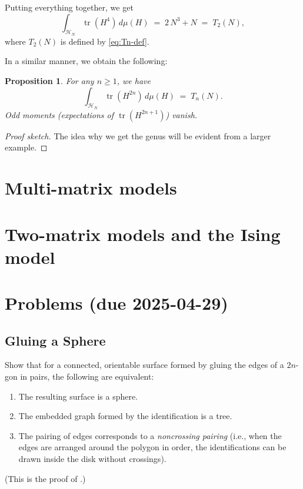 \documentclass[letterpaper,11pt,oneside,reqno]{article}
\numberwithin{equation}{section}
\newtheorem{proposition}{Proposition}[section]
\theoremstyle{definition}
\begin{document}
Putting everything together, we get
\[
  \int_{\mathcal{H}_N}\!\operatorname{tr}(H^4)\,d\mu(H)
  \;=\;
  2\,N^3 + N
  \;=\;
	T_2(N),
\]
where $T_2(N)$ is defined by \eqref{eq:Tn-def}.

In a similar manner, we obtain the following:
\begin{proposition}
	\label{prop:traces-moments}
	For any $n\ge 1$, we have
	\[
		\int_{\mathcal{H}_N}\!\operatorname{tr}(H^{2n})\,d\mu(H)
		\;=\;
		T_n(N).
	\]
	Odd moments (expectations of $\operatorname{tr}(H^{2n+1})$) vanish.
\end{proposition}
\begin{proof}[Proof sketch]
	The idea why we get the genus will be evident from a larger example. 

	
\end{proof}








\section{Multi-matrix models}



\section{Two-matrix models and the Ising model}




























\appendix
\setcounter{section}{14}

\section{Problems (due 2025-04-29)}

\subsection{Gluing a Sphere}
\label{prob:gluing_sphere}
Show that for a connected, orientable surface formed by gluing the edges of a $2n$-gon in pairs, the following are equivalent:
\begin{enumerate}
	\item The resulting surface is a sphere.
	\item The embedded graph formed by the identification is a tree.
	\item The pairing of edges corresponds to a \emph{noncrossing pairing} (i.e., when the edges are arranged around the polygon in order, the identifications can be drawn inside the disk without crossings).
\end{enumerate}
(This is the proof of .)
\end{document}
